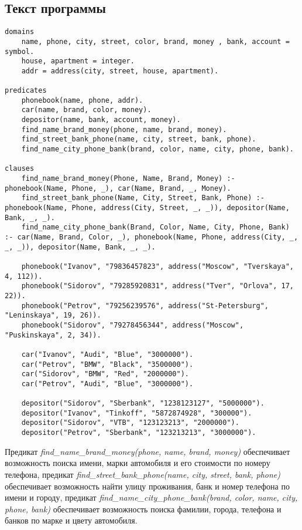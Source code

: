 \documentclass[a4paper,12pt]{article}
\begin{document}
\subsection*{Текст программы}

\begin{lstlisting}[caption=База знаний]
domains
    name, phone, city, street, color, brand, money , bank, account = symbol.
    house, apartment = integer.
    addr = address(city, street, house, apartment).
    
predicates
    phonebook(name, phone, addr).
    car(name, brand, color, money).
    depositor(name, bank, account, money).
    find_name_brand_money(phone, name, brand, money).
    find_street_bank_phone(name, city, street, bank, phone).
    find_name_city_phone_bank(brand, color, name, city, phone, bank).
    
clauses
    find_name_brand_money(Phone, Name, Brand, Money) :- phonebook(Name, Phone, _), car(Name, Brand, _, Money).
    find_street_bank_phone(Name, City, Street, Bank, Phone) :- phonebook(Name, Phone, address(City, Street, _, _)), depositor(Name, Bank, _, _).
    find_name_city_phone_bank(Brand, Color, Name, City, Phone, Bank) :- car(Name, Brand, Color, _), phonebook(Name, Phone, address(City, _, _, _)), depositor(Name, Bank, _, _).
    
    phonebook("Ivanov", "79836457823", address("Moscow", "Tverskaya", 4, 112)).
    phonebook("Sidorov", "79285920831", address("Tver", "Orlova", 17, 22)). 
    phonebook("Petrov", "79256239576", address("St-Petersburg", "Leninskaya", 19, 26)).
    phonebook("Sidorov", "79278456344", address("Moscow", "Puskinskaya", 2, 34)).
    
    car("Ivanov", "Audi", "Blue", "3000000").
    car("Petrov", "BMW", "Black", "3500000").
    car("Sidorov", "BMW", "Red", "2000000").
    car("Petrov", "Audi", "Blue", "3000000").

    depositor("Sidorov", "Sberbank", "1238123127", "5000000").
    depositor("Ivanov", "Tinkoff", "5872874928", "300000").
    depositor("Sidorov", "VTB", "123123213", "2000000").
    depositor("Petrov", "Sberbank", "123213213", "3000000").
\end{lstlisting}

Предикат \emph{find\_name\_brand\_money(phone, name, brand, money)} обеспечивает возможность поиска имени, марки автомобиля и его стоимости по номеру телефона, предикат \emph{find\_street\_bank\_phone(name, city, street, bank, phone)} обеспечивает возможность найти улицу проживания, банк и номер телефона по имени и городу, предикат \emph{find\_name\_city\_phone\_bank(brand, color, name, city, phone, bank)} обеспечивает возможность поиска фамилии, города, телефона и банков по марке и цвету автомобиля.
\end{document}
